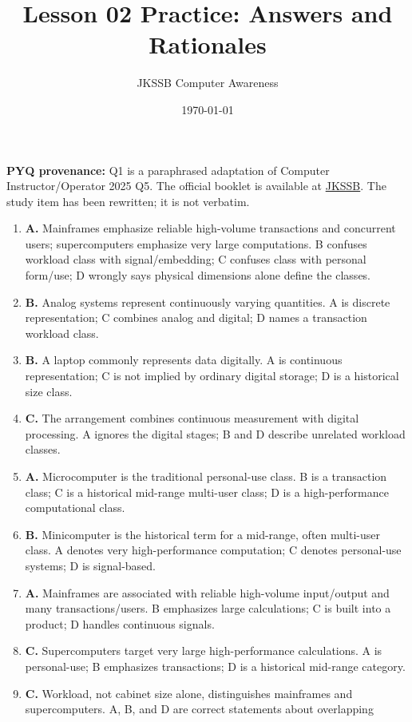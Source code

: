 \documentclass[11pt]{article}
\title{Lesson 02 Practice: Answers and Rationales}
\author{JKSSB Computer Awareness}
\date{\today}
\begin{document}
\maketitle
\noindent\textbf{PYQ provenance:} Q1 is a paraphrased adaptation of
Computer Instructor/Operator 2025 Q5. The official booklet is available at
\href{https://jkssb.nic.in/Pdf/COMPUTER\%20INSTRUCTOR\%20-OPERATOR.pdf}
{JKSSB}. The study item has been rewritten; it is not verbatim.
\begin{enumerate}[label=\textbf{Q\arabic*.}, leftmargin=*]
\item \textbf{A.} Mainframes emphasize reliable high-volume transactions
  and concurrent users; supercomputers emphasize very large computations.
  B confuses workload class with signal/embedding; C confuses class with
  personal form/use; D wrongly says physical dimensions alone define the
  classes.
\item \textbf{B.} Analog systems represent continuously varying quantities.
  A is discrete representation; C combines analog and digital; D names a
  transaction workload class.
\item \textbf{B.} A laptop commonly represents data digitally. A is
  continuous representation; C is not implied by ordinary digital storage;
  D is a historical size class.
\item \textbf{C.} The arrangement combines continuous measurement with
  digital processing. A ignores the digital stages; B and D describe
  unrelated workload classes.
\item \textbf{A.} Microcomputer is the traditional personal-use class. B is
  a transaction class; C is a historical mid-range multi-user class; D is
  a high-performance computational class.
\item \textbf{B.} Minicomputer is the historical term for a mid-range,
  often multi-user class. A denotes very high-performance computation; C
  denotes personal-use systems; D is signal-based.
\item \textbf{A.} Mainframes are associated with reliable high-volume
  input/output and many transactions/users. B emphasizes large calculations;
  C is built into a product; D handles continuous signals.
\item \textbf{C.} Supercomputers target very large high-performance
  calculations. A is personal-use; B emphasizes transactions; D is a
  historical mid-range category.
\item \textbf{C.} Workload, not cabinet size alone, distinguishes mainframes
  and supercomputers. A, B, and D are correct statements about overlapping

\end{enumerate}
\end{document}
